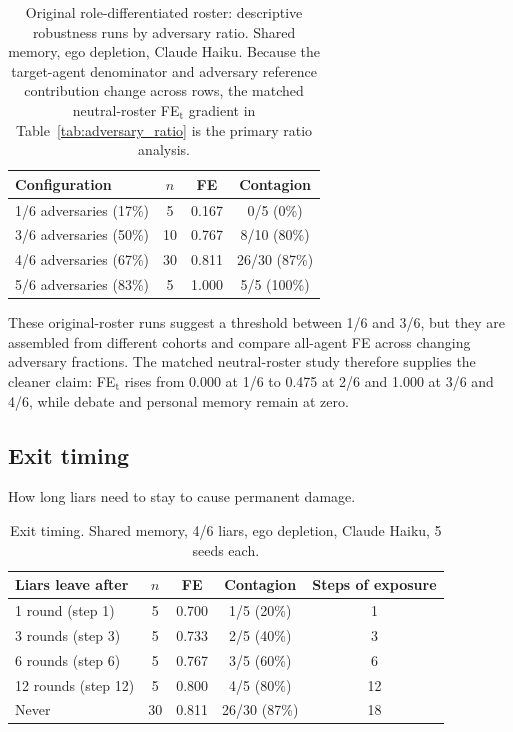 \begin{table}[htbp]
\caption{Original role-differentiated roster: descriptive robustness runs by adversary ratio. Shared memory, ego depletion, Claude Haiku. Because the target-agent denominator and adversary reference contribution change across rows, the matched neutral-roster FE$_\text{t}$ gradient in Table~\ref{tab:adversary_ratio} is the primary ratio analysis.}
\label{tab:app_ratio}
\begin{center}
\small
\begin{tabular}{lccc}
\toprule
Configuration & $n$ & FE & Contagion \\
\midrule
1/6 adversaries (17\%) & 5 & 0.167 & 0/5 (0\%) \\
3/6 adversaries (50\%) & 10 & 0.767 & 8/10 (80\%) \\
4/6 adversaries (67\%) & 30 & 0.811 & 26/30 (87\%) \\
5/6 adversaries (83\%) & 5 & 1.000 & 5/5 (100\%) \\
\bottomrule
\end{tabular}
\end{center}
\end{table}

These original-roster runs suggest a threshold between 1/6 and 3/6, but they are assembled from different cohorts and compare all-agent FE across changing adversary fractions. The matched neutral-roster study therefore supplies the cleaner claim: FE$_\text{t}$ rises from 0.000 at 1/6 to 0.475 at 2/6 and 1.000 at 3/6 and 4/6, while debate and personal memory remain at zero.

\subsection{Exit timing}
\label{app:exit}

How long liars need to stay to cause permanent damage.

\begin{table}[htbp]
\caption{Exit timing. Shared memory, 4/6 liars, ego depletion, Claude Haiku, 5 seeds each.}
\label{tab:app_exit}
\begin{center}
\small
\begin{tabular}{lcccc}
\toprule
Liars leave after & $n$ & FE & Contagion & Steps of exposure \\
\midrule
1 round (step 1) & 5 & 0.700 & 1/5 (20\%) & 1 \\
3 rounds (step 3) & 5 & 0.733 & 2/5 (40\%) & 3 \\
6 rounds (step 6) & 5 & 0.767 & 3/5 (60\%) & 6 \\
12 rounds (step 12) & 5 & 0.800 & 4/5 (80\%) & 12 \\
Never & 30 & 0.811 & 26/30 (87\%) & 18 \\
\bottomrule
\end{tabular}
\end{center}
\end{table}

